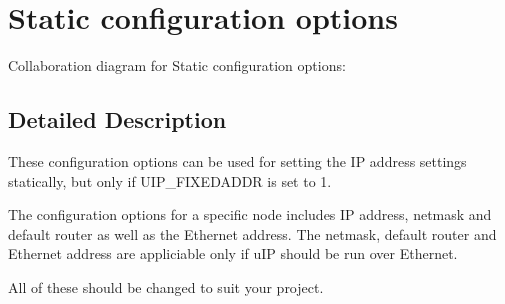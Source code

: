 \hypertarget{a00071}{
\section{Static configuration options}
\label{a00071}
}


Collaboration diagram for Static configuration options:

\subsection{Detailed Description}
These configuration options can be used for setting the IP address settings statically, but only if UIP\_\-FIXEDADDR is set to 1. 

The configuration options for a specific node includes IP address, netmask and default router as well as the Ethernet address. The netmask, default router and Ethernet address are appliciable only if u\-IP should be run over Ethernet.

All of these should be changed to suit your project. 


